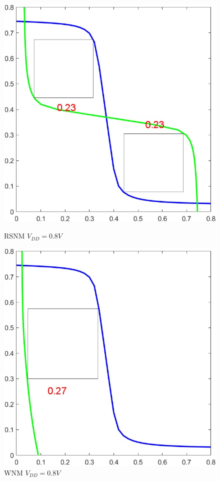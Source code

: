 \documentclass{article}
\begin{document}
\begin{figure}[H]
\centering
\begin{minipage}[t]{0.28\textwidth}
\centering
    \includegraphics[width=\textwidth]{./img/2023-11-12-04-04-03.png}
\caption{RSNM $V_{DD} = 0.8V$}
\label{8rsnm08}
\end{minipage}
\qquad
\begin{minipage}[t]{0.28\textwidth}
\centering
    \includegraphics[width=\textwidth]{./img/2023-11-12-04-04-10.png}
\caption{WNM $V_{DD} = 0.8V$}
\label{8wnm08}
\end{minipage}
\end{figure}
\end{document}
